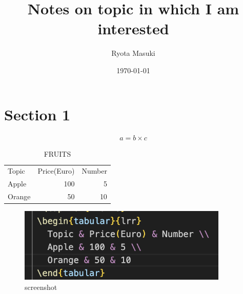 \documentclass{article}
\title{Notes on topic in which I am interested}
\author{Ryota Masuki}
\date{\today}
\begin{document}
\maketitle

\section{Section 1}
\begin{align}
    a = b\times c
\end{align}
\begin{table}
    \begin{center}
      \caption{FRUITS}
     \begin{tabular}{lrr}
       Topic & Price(Euro) & Number \\
       Apple & 100 & 5 \\
       Orange & 50 & 10
     \end{tabular}
    \end{center}
   \end{table}

   \begin{figure}[htbp]
    \begin{center}
    \includegraphics[width=100mm]{screenshot.png}
    \caption{screenshot}
    \end{center}
    \end{figure}
    
   
\end{document}
